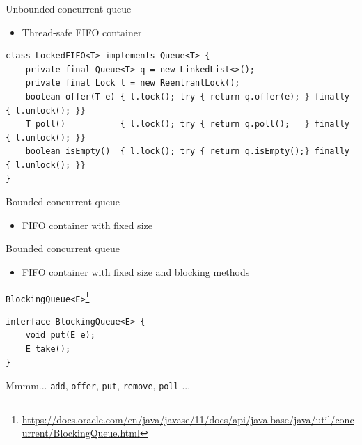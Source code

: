 \begin{frame}[t,fragile]{Unbounded concurrent queue}

\begin{itemize}
    \item Thread-safe FIFO container    
\end{itemize}

\begin{verbatim}
class LockedFIFO<T> implements Queue<T> {
    private final Queue<T> q = new LinkedList<>();
    private final Lock l = new ReentrantLock();
    boolean offer(T e) { l.lock(); try { return q.offer(e); } finally { l.unlock(); }}
    T poll()           { l.lock(); try { return q.poll();   } finally { l.unlock(); }}
    boolean isEmpty()  { l.lock(); try { return q.isEmpty();} finally { l.unlock(); }}
}
\end{verbatim}
\end{frame}


\begin{frame}[t,fragile]{Bounded concurrent queue}

\begin{itemize}
    \item FIFO container with fixed size
\end{itemize}

\end{frame}


\begin{frame}{Bounded concurrent queue}

\begin{itemize}
    \item FIFO container with fixed size and blocking methods
\end{itemize}

\pause
\texttt{BlockingQueue<E>}\footnote<2->{\tiny\url{https://docs.oracle.com/en/java/javase/11/docs/api/java.base/java/util/concurrent/BlockingQueue.html}}
\begin{verbatim}
interface BlockingQueue<E> {
    void put(E e);
    E take();
}
\end{verbatim}
\pause

Mmmm... \texttt{add}, \texttt{offer}, \texttt{put}, \texttt{remove}, \texttt{poll} ...

\end{frame}

